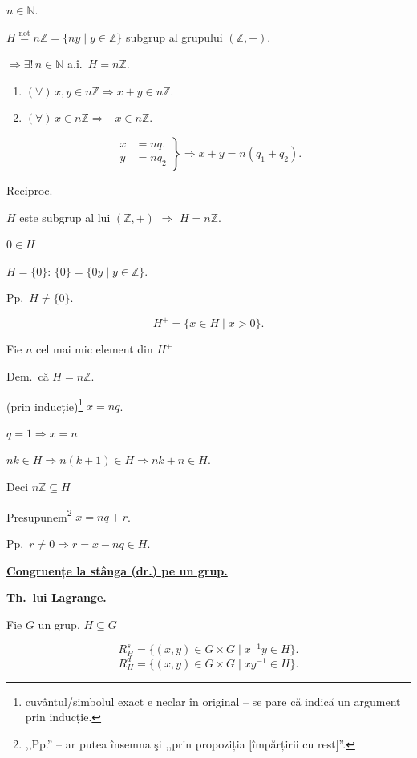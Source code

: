 \documentclass[12pt]{article}
\begin{document}
\noindent $n\in\mathbb{N}$.

\bigskip
\noindent $H \overset{\text{not}}{=} n\mathbb{Z} = \{ny \mid y\in\mathbb{Z}\}$ subgrup al grupului $(\mathbb{Z},+)$.

\noindent $\Rightarrow \exists!\, n\in\mathbb{N}$ a.î.\ $H=n\mathbb{Z}$.

\begin{enumerate}
\item[1)] $(\forall)\, x,y\in n\mathbb{Z} \Rightarrow x+y\in n\mathbb{Z}$.
\item[2)] $(\forall)\, x\in n\mathbb{Z} \Rightarrow -x\in n\mathbb{Z}$.
\end{enumerate}

\[
\left.\begin{aligned}
x&=nq_1\\
y&=nq_2
\end{aligned}\right\} \Rightarrow x+y = n(q_1+q_2).
\]

\bigskip
\noindent\underline{Reciproc.}

\noindent $H$ este subgrup al lui $(\mathbb{Z},+)$ $\Rightarrow$ $H=n\mathbb{Z}$.

\noindent $0\in H$

\noindent $H=\{0\}$: \quad $\{0\} = \{0y \mid y\in\mathbb{Z}\}$.

\noindent Pp.\ $H\neq\{0\}$.

\[
H^+ = \{x\in H \mid x>0\}.
\]

\noindent Fie $n$ cel mai mic element din $H^+$

\noindent Dem.\ că $H=n\mathbb{Z}$.

\bigskip
\noindent (prin inducție)\footnote{cuvântul/simbolul exact e neclar în original -- se pare că indică un argument prin inducție.} $x=nq$.

\noindent $q=1 \Rightarrow x=n$

\noindent $nk\in H \Rightarrow n(k+1)\in H \Rightarrow nk+n\in H$.

\noindent Deci $n\mathbb{Z}\subseteq H$

\bigskip
\noindent Presupunem\footnote{,,Pp.'' -- ar putea însemna şi ,,prin propoziția [împărțirii cu rest]''.} $x=nq+r$.

\noindent Pp.\ $r\neq 0 \Rightarrow r=x-nq\in H$.

\bigskip
\noindent\underline{\textbf{Congruențe la stânga (dr.) pe un grup.}}

\noindent\underline{\textbf{Th.\ lui Lagrange.}}

\bigskip
\noindent Fie $G$ un grup, $H\subseteq G$

\[
R_H^s = \{(x,y)\in G\times G \mid x^{-1}y\in H\}.
\]
\[
R_H^d = \{(x,y)\in G\times G \mid xy^{-1}\in H\}.
\]
\end{document}
